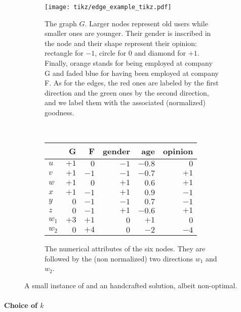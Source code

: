 \begin{figure*}[htpb]
  \begin{subfigure}[t]{0.55\textwidth}
    \centering
    \texttt{[image: tikz/edge\_example\_tikz.pdf]}
    \caption{The graph $G$. Larger nodes represent old users while smaller ones are younger. Their
    gender is inscribed in the node and their shape represent their opinion: rectangle for $-1$,
    circle for $0$ and diamond for $+1$. Finally, orange stands for being employed at company G and
    faded blue for having been employed at company F. As for the edges, the red ones are labeled by
    the first direction and the green ones by the second direction, and we label them with the
    associated (normalized) goodness. } \label{fig:edge_exe_graph}
  \end{subfigure}~
  \begin{subfigure}[t]{0.42\textwidth}
    \centering
    \small
    \begin{tabular}{lrrrrr}
      \toprule
      {}    & G   & F    & gender & age    & opinion \\
      \midrule
      $u$   &  $+1$ &   $0$ &   $-1$ &  $-0.8$ &     $0$ \\
      $v$   &  $+1$ &  $-1$ &   $-1$ &  $-0.7$ &    $+1$ \\
      $w$   &  $+1$ &   $0$ &   $+1$ &   $0.6$ &    $+1$ \\
      $x$   &  $+1$ &  $-1$ &   $+1$ &   $0.9$ &    $-1$ \\
      $y$   &   $0$ &  $-1$ &   $-1$ &   $0.7$ &    $-1$ \\
      $z$   &   $0$ &  $-1$ &   $+1$ &  $-0.6$ &    $+1$ \\
      \midrule
      $w_1$ &  $+3$ &  $+1$ &    $0$ &    $+1$ &     $0$ \\
      $w_2$ &  $0$  &  $+4$ &    $0$ &    $-2$ &    $-4$ \\
      \bottomrule
    \end{tabular}
    \caption{The numerical attributes of the six nodes. They are followed by the (non normalized)
    two directions $w_1$ and $w_2$.} \label{tab:edge_exe}
  \end{subfigure}
  \caption{A small instance of \ecp{} and an handcrafted solution, albeit non-optimal.}
  \label{fig:edge_exe}
\end{figure*}

\paragraph{Choice of $k$}
\label{par:edge_choose_k}

